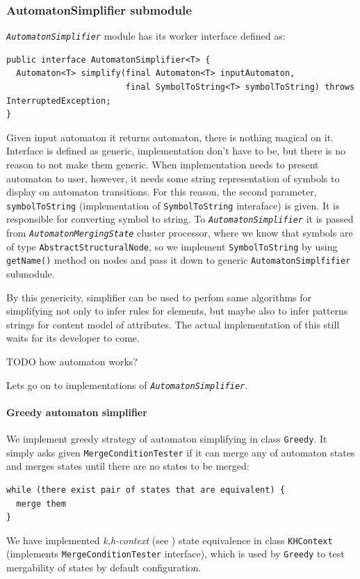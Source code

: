 \documentclass[a4paper,10pt,oneside]{article}
\newcommand{\code}[1]{\texttt{#1}}
\newcommand{\jmodule}[1]{\texttt{\textit{#1}}}
\begin{document}
\subsubsection{AutomatonSimplifier submodule}
\jmodule{AutomatonSimplifier} module has its worker interface defined as:
\begin{verbatim}
public interface AutomatonSimplifier<T> {
  Automaton<T> simplify(final Automaton<T> inputAutomaton, 
                        final SymbolToString<T> symbolToString) throws InterruptedException;
}
\end{verbatim}
Given input automaton it returns automaton, there is nothing magical on it.
Interface is defined as generic, implementation don't have to be, but there is no reason to not make them generic.
When implementation needs to present automaton to user, however, it needs some string representation of symbols to display on automaton transitions.
For this reason, the second parameter, \code{symbolToString} (implementation of \code{SymbolToString} interaface) is given.
It is responsible for converting symbol to string.
To \jmodule{AutomatonSimplifier} it is passed from \jmodule{AutomatonMergingState} cluster processor, where we know that symbols are of type \code{AbstractStructuralNode}, so we implement \code{SymbolToString} by using \code{getName()} method on nodes and pass it down to generic \code{AutomatonSimplfifier} submodule.

By this genericity, simplifier can be used to perfom same algorithms for simplifying not only to infer rules for elements, but maybe also to infer patterns strings for content model of attributes.
The actual implementation of this still waits for its developer to come.

TODO how automaton works?

Lets go on to implementations of \jmodule{AutomatonSimplifier}.

\paragraph{Greedy automaton simplifier} We implement greedy strategy of automaton simplifying in class \code{Greedy}.
It simply asks given \code{MergeConditionTester} if it can merge any of automaton states and merges states until there are no states to be merged:
\begin{verbatim}
while (there exist pair of states that are equivalent) {
  merge them
}
\end{verbatim}
We have implemented \emph{k,h-context} (see \cite{ahonen}) state equivalence in class \code{KHContext} (implements \code{MergeConditionTester} interface), which is used by \code{Greedy} to test mergability of states by default configuration.
\end{document}
